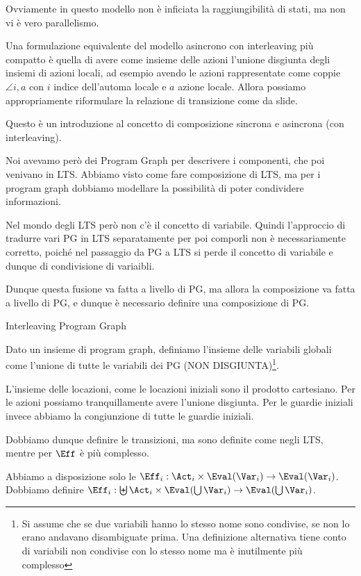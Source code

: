 Ovviamente in questo modello non è inficiata la raggiungibilità di stati, ma non vi è vero parallelismo.


Una formulazione equivalente del modello asincrono con interleaving più compatto è quella di avere come insieme delle azioni l'unione disgiunta degli insiemi di azioni locali, ad esempio avendo le azioni rappresentate come coppie \(\angle{i,a}\) con \(i\) indice dell'automa locale e \(a\) azione locale. Allora possiamo appropriamente riformulare la relazione di transizione come da slide.

Questo è un introduzione al concetto di composizione sincrona e asincrona (con interleaving).

Noi avevamo però dei Program Graph per descrivere i componenti, che poi venivano  in LTS. Abbiamo visto come fare composizione di LTS, ma per i program graph dobbiamo modellare la possibilità di poter condividere informazioni.

Nel mondo degli LTS però non c'è il concetto di variabile. Quindi l'approccio di tradurre vari PG in LTS separatamente per poi comporli non è necessariamente corretto, poiché nel passaggio da PG a LTS si perde il concetto di variabile e dunque di condivisione di variaibli.

Dunque questa fusione va fatta a livello di PG, ma allora la composizione va fatta a livello di PG, e dunque è necessario definire una composizione di PG.

Interleaving Program Graph

Dato un insieme di program graph, definiamo l'insieme delle variabili globali come l'unione di tutte le variabili dei PG (NON DISGIUNTA)\footnote{Si assume che se due variabili hanno lo stesso nome sono condivise, se non lo erano andavano disambiguate prima. Una definizione alternativa tiene conto di variabili non condivise con lo stesso nome ma è inutilmente più complesso}.

L'insieme delle locazioni, come le locazioni iniziali sono il prodotto cartesiano. Per le azioni possiamo tranquillamente avere l'unione disgiunta. Per le guardie iniziali invece abbiamo la congiunzione di tutte le guardie iniziali.

Dobbiamo dunque definire le transizioni, ma sono definite come negli LTS, mentre per \(\Eff\) è più complesso.

Abbiamo a disposizione solo le \(\Eff_i: \Act_i \times \Eval(\Var_i)\to \Eval(\Var_i)\). Dobbiamo definire \(\Eff_i:\biguplus \Act_i \times \Eval(\bigcup\Var_i)\to \Eval(\bigcup\Var_i) \).

